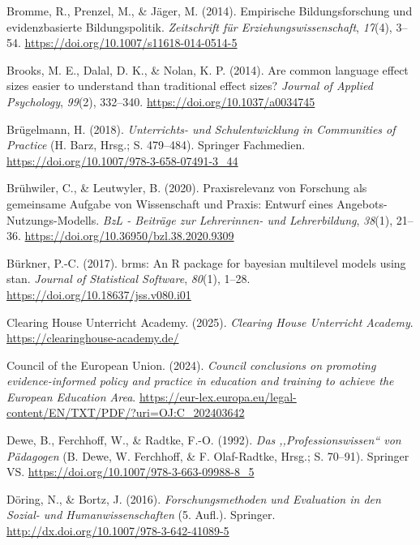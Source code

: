 \documentclass[
  jou,
  floatsintext,
  longtable,
  nolmodern,
  notxfonts,
  notimes,
  colorlinks=true,linkcolor=blue,citecolor=blue,urlcolor=blue]{apa7}
\newlength{\cslhangindent}
\newenvironment{CSLReferences}[2] %
 {\begin{list}{}{%
  \setlength{\itemindent}{0pt}
  \setlength{\leftmargin}{0pt}
  \setlength{\parsep}{0pt}
  \ifodd #1
   \setlength{\leftmargin}{\cslhangindent}
   \setlength{\itemindent}{-1\cslhangindent}
  \fi
  \setlength{\itemsep}{#2\baselineskip}}}
 {\end{list}}
\begin{document}
\begin{CSLReferences}{1}{0}
Bromme, R., Prenzel, M., \& Jäger, M. (2014). Empirische
Bildungsforschung und evidenzbasierte Bildungspolitik. \emph{Zeitschrift
für Erziehungswissenschaft}, \emph{17}(4), 3--54.
\url{https://doi.org/10.1007/s11618-014-0514-5}

Brooks, M. E., Dalal, D. K., \& Nolan, K. P. (2014). Are common language
effect sizes easier to understand than traditional effect sizes?
\emph{Journal of Applied Psychology}, \emph{99}(2), 332--340.
\url{https://doi.org/10.1037/a0034745}

Brügelmann, H. (2018). \emph{Unterrichts- und Schulentwicklung in
Communities of Practice} (H. Barz, Hrsg.; S. 479--484). Springer
Fachmedien. \url{https://doi.org/10.1007/978-3-658-07491-3_44}

Brühwiler, C., \& Leutwyler, B. (2020). Praxisrelevanz von Forschung als
gemeinsame Aufgabe von Wissenschaft und Praxis: Entwurf eines
Angebots-Nutzungs-Modells. \emph{BzL - Beiträge zur Lehrerinnen- und
Lehrerbildung}, \emph{38}(1), 21--36.
\url{https://doi.org/10.36950/bzl.38.2020.9309}

Bürkner, P.-C. (2017). brms: An R package for bayesian multilevel models
using stan. \emph{Journal of Statistical Software}, \emph{80}(1), 1--28.
\url{https://doi.org/10.18637/jss.v080.i01}

Clearing House Unterricht Academy. (2025). \emph{Clearing House
Unterricht Academy}. \url{https://clearinghouse-academy.de/}

Council of the European Union. (2024). \emph{Council conclusions on
promoting evidence-informed policy and practice in education and
training to achieve the European Education Area}.
\url{https://eur-lex.europa.eu/legal-content/EN/TXT/PDF/?uri=OJ:C_202403642}

Dewe, B., Ferchhoff, W., \& Radtke, F.-O. (1992). \emph{Das
{,,}Professionswissen{``} von Pädagogen} (B. Dewe, W. Ferchhoff, \& F.
Olaf-Radtke, Hrsg.; S. 70--91). Springer VS.
\url{https://doi.org/10.1007/978-3-663-09988-8_5}

Döring, N., \& Bortz, J. (2016). \emph{Forschungsmethoden und Evaluation
in den Sozial- und Humanwissenschaften} (5. Aufl.). Springer.
\url{http://dx.doi.org/10.1007/978-3-642-41089-5}


\end{CSLReferences}
\end{document}
